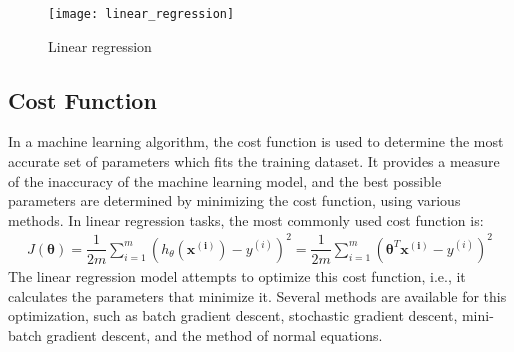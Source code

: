 \documentclass[a4paper, 12pt]{article}
\begin{document}
\begin{figure}[H]
\centering
\texttt{[image: linear\_regression]}
\caption{Linear regression}
\end{figure}

\subsection{Cost Function}
In a machine learning algorithm, the cost function is used to determine the most accurate set of parameters which fits the training dataset. It provides a measure of the inaccuracy of the machine learning model, and the best possible parameters are determined by minimizing the cost function, using various methods. In linear regression tasks, the most commonly used cost function is:
\begin{align*}
J\left(\bm{\theta}\right) = \dfrac{1}{2m}\sum_{i=1}^{m}\left(h_{\theta}\left(\bm{x^{\left(i\right)}}\right)-y^{\left(i\right)}\right)^2 = \dfrac{1}{2m}\sum_{i=1}^{m}\left(\bm{\theta}^T\bm{x^{\left(i\right)}}-y^{\left(i\right)}\right)^2
\end{align*}
The linear regression model attempts to optimize this cost function, i.e., it calculates the parameters that minimize it. Several methods are available for this optimization, such as batch gradient descent, stochastic gradient descent, mini-batch gradient descent, and the method of normal equations.
\end{document}
